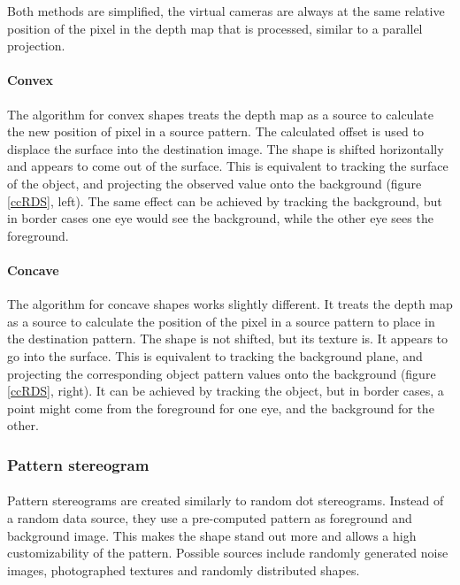 Both methods are simplified, the virtual cameras are always at the same relative position of the pixel in the depth map that is processed, similar to a parallel projection.

\paragraph{Convex}
The algorithm for convex shapes treats the depth map as a source to calculate the new position of pixel in a source pattern.
The calculated offset is used to displace the surface into the destination image.
The shape is shifted horizontally and appears to come out of the surface.
This is equivalent to tracking the surface of the object, and projecting the observed value onto the background (figure \ref{ccRDS}, left).
The same effect can be achieved by tracking the background, but in border cases one eye would see the background, while the other eye sees the foreground.

\paragraph{Concave}
The algorithm for concave shapes works slightly different.
It treats the depth map as a source to calculate the position of the pixel in a source pattern to place in the destination pattern.
The shape is not shifted, but its texture is.
It appears to go into the surface.
This is equivalent to tracking the background plane, and projecting the corresponding object pattern values onto the background (figure \ref{ccRDS}, right).
It can be achieved by tracking the object, but in border cases,  a point might come from the foreground for one eye, and the background for the other.

\subsubsection{Pattern stereogram}
\paragraph{}
Pattern stereograms are created similarly to random dot stereograms.
Instead of a random data source, they use a pre-computed pattern as foreground and background image.
This makes the shape stand out more and allows a high customizability of the pattern.
Possible sources include randomly generated noise images, photographed textures and randomly distributed shapes.

